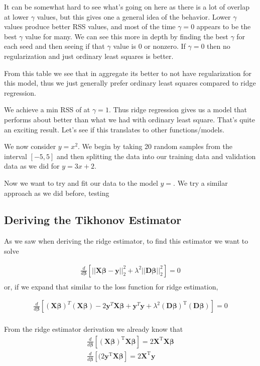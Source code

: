 \documentclass{article}
\newcommand{\y}{\mathbf{y}}
\newcommand{\X}{\mathbf{X}}
\newcommand{\B}{\boldsymbol\beta} %
\newcommand{\D}{\mathbf{D}}
\begin{document}
It can be somewhat hard to see what's going on here as there is a lot of overlap at lower $\gamma$ values, but this gives one a general idea of the behavior. Lower $\gamma$ values produce better RSS values,
and most of the time $\gamma = 0$ appears to be the best $\gamma$ value for many. We can see this more in depth by finding the best $\gamma$ for each seed and then seeing if that $\gamma$ value is 0 or nonzero. 
If $\gamma = 0$ then no regularization and just ordinary least squares is better.

From this table we see that in aggregate its better to not have regularization for this model, thus we just generally prefer ordinary least squares compared to ridge regression.


We achieve a min RSS of at $\gamma = 1$. Thus ridge regression gives us a model that performs about %
better than what we had with ordinary least square. That's quite an exciting result. Let's see if this translates to other functions/models.


We now consider $y = x^2$. We begin by taking 20 random samples from the interval $[-5,5]$ and then splitting the data into our training data and validation
data as we did for $y = 3x + 2$. 

Now we want to try and fit our data to the model $y = $. We try a similar approach as we did before, testing 
\subsection{Deriving the Tikhonov Estimator}

As we saw when deriving the ridge estimator, to find this estimator we want to solve

\begin{align*}
\frac{d}{d\B} \left[ ||\X\B-\y||_{2}^{2} + \lambda^2||\D \B||_{2}^{2} \right] = 0 \\
\end{align*}
or, if we expand that similar to the loss function for ridge estimation, 

\begin{align*}
\frac{d}{d\B} \left[ (\X\B)^T(\X\B) -2 \y^T \X\B + \y^T \y + \lambda^2(\D\B)^{\textrm{T}}(\D\B) \right] = 0 \\
\end{align*}

From the ridge estimator derivation we already know that 
\begin{align*}
\frac{d}{d\B} [ (\X\B)^{\textrm{T}} \X\B ] = 2\X^{\textrm{T}}\X\B \\
\frac{d}{d\B} [ (2\y^{\textrm{T}} \X\B ] = 2\X^{\textrm{T}}\y
\end{align*}
\end{document}
